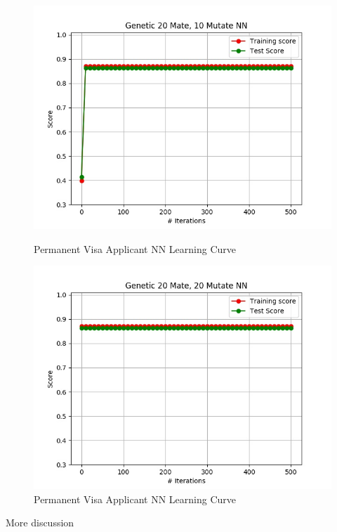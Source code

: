 \documentclass[h]{article}
\begin{document}
 \begin{figure}[H]
      \includegraphics[width=1\textwidth,keepaspectratio]{genetic_20_mate,_10_mutate_nn.jpg} 
      \caption*{Permanent Visa Applicant NN Learning Curve} 
   \endminipage\hfill
      \includegraphics[width=1\textwidth,keepaspectratio]{genetic_20_mate,_20_mutate_nn.jpg} 
      \caption*{Permanent Visa Applicant NN Learning Curve} 
   \endminipage\hfill
\end{figure}

More discussion
\end{document}
